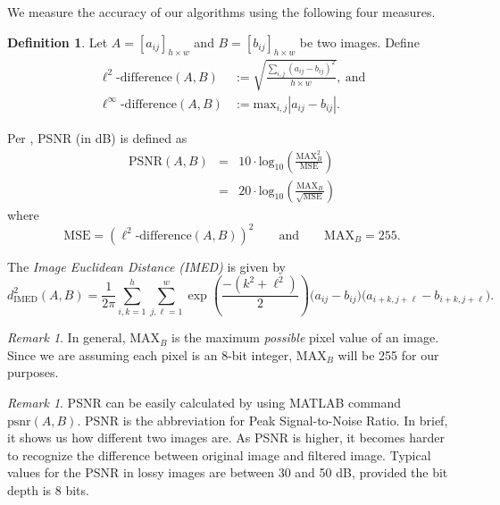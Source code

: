 \documentclass[12pt]{amsart}
\theoremstyle{definition}
\newtheorem{defn}[thm]{Definition}
\theoremstyle{remark}
\newtheorem{rem}[thm]{Remark}
\numberwithin{thm}{section}
\begin{document}
We measure the accuracy of our algorithms using the following four measures.

\begin{defn}
Let $A=[a_{ij}]_{h \times w}$ and $B=[b_{ij}]_{h \times w}$ be two images.
Define
\begin{align*}
\ell^2\text{-difference}(A,B) &:= \sqrt{ \frac{ \sum_{i,j} \left( a_{ij} - b_{ij} \right)^2} {h \times w}},\ \textrm{and}\\
\ell^\infty\text{-difference}(A,B) &:= \textrm{max}_{i,j} \left \vert a_{ij} - b_{ij} \right\vert.
\end{align*}

Per \cite{HG08}, PSNR (in dB) is defined as
\begin{displaymath}
\begin{array}{ccl}
\textrm{PSNR}(A,B) & = & 10\cdot \textrm{log}_{10} \left( \frac{\textrm{MAX}_B^2}{\textrm{MSE}} \right)\\
		 & = & 20 \cdot \textrm{log}_{10} \left( \frac{\textrm{MAX}_B}{\sqrt{\textrm{MSE}}} \right)
\end{array}
\end{displaymath}
where
\begin{displaymath}
\textrm{MSE} = (\ell^2\text{-difference}(A,B))^2 \qquad \textrm{and} \qquad \textrm{MAX}_B= 255.
\end{displaymath}

The \emph{Image Euclidean Distance (IMED)} is given by
\[d_\text{IMED}^2(A,B) = \frac{1}{2\pi}\sum_{i,k = 1}^h\sum_{j,\ell = 1}^w \exp\left(\frac{-(k^2+\ell^2)}{2}\right)\big(a_{ij}-b_{ij}\big)\big(a_{i+k,j+\ell} - b_{i+k,j+\ell}\big).\]
\end{defn}

\begin{rem}
In general, $\text{MAX}_B$ is the maximum \emph{possible} pixel value of an image. Since we are assuming each pixel is an 8-bit integer, $\text{MAX}_B$ will be 255 for our purposes.
\end{rem}

\begin{rem}
PSNR can be easily calculated by using MATLAB command $\textrm{psnr}(A,B)$.
PSNR is the abbreviation for Peak Signal-to-Noise Ratio. In brief, it shows us how different two images are. As PSNR is higher, it becomes harder to recognize the difference between original image and filtered image. Typical values for the PSNR in lossy images are between 30 and 50 dB, provided the bit depth is 8 bits. 
\end{rem}
\end{document}
